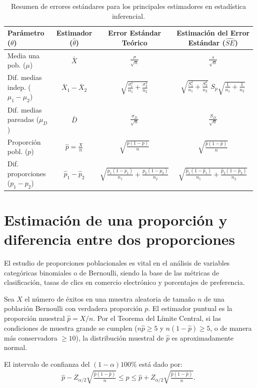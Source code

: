 \begin{table}[h!]
	\centering
	\begin{tabular}{lccc}
		\hline
		\textbf{Parámetro ($\theta$)} & \textbf{Estimador ($\hat{\theta}$)} & \textbf{Error Estándar Teórico} & \textbf{Estimación del Error Estándar ($\widehat{SE}$)} \\ \hline
		Media una pob. ($\mu$) & $\bar{X}$ & $\frac{\sigma}{\sqrt{n}}$ & $\frac{s}{\sqrt{n}}$ \\ [1.5ex]
		Dif. medias indep. ($\mu_1 - \mu_2$) & $\bar{X}_1 - \bar{X}_2$ & $\sqrt{\frac{\sigma_1^2}{n_1} + \frac{\sigma_2^2}{n_2}}$ & $\sqrt{\frac{S_1^2}{n_1} + \frac{S_2^2}{n_2}}$ \text{ o } $S_p \sqrt{\frac{1}{n_1} + \frac{1}{n_2}}$ \\ [1.5ex]
		Dif. medias pareadas ($\mu_D$) & $\bar{D}$ & $\frac{\sigma_D}{\sqrt{n}}$ & $\frac{S_D}{\sqrt{n}}$ \\ [1.5ex]
		Proporción pobl. ($p$) & $\hat{p} = \frac{X}{n}$ & $\sqrt{\frac{p(1-p)}{n}}$ & $\sqrt{\frac{\hat{p}(1-\hat{p})}{n}}$ \\ [1.5ex]
		Dif. proporciones ($p_1 - p_2$) & $\hat{p}_1 - \hat{p}_2$ & $\sqrt{\frac{p_1(1-p_1)}{n_1} + \frac{p_2(1-p_2)}{n_2}}$ & $\sqrt{\frac{\hat{p}_1(1-\hat{p}_1)}{n_1} + \frac{\hat{p}_2(1-\hat{p}_2)}{n_2}}$ \\ \hline
	\end{tabular}
	\caption{Resumen de errores estándares para los principales estimadores en estadística inferencial.}
	\label{tab:errores_estandar}
\end{table}

\section{Estimación de una proporción y diferencia entre dos proporciones}

El estudio de proporciones poblacionales es vital en el análisis de variables categóricas binomiales o de Bernoulli, siendo la base de las métricas de clasificación, tasas de clics en comercio electrónico y porcentajes de preferencia.

\begin{teorema}
	Sea $X$ el número de éxitos en una muestra aleatoria de tamaño $n$ de una población Bernoulli con verdadera proporción $p$. El estimador puntual es la proporción muestral $\hat{p} = X/n$. Por el Teorema del Límite Central, si las condiciones de muestra grande se cumplen ($n\hat{p} \geq 5$ y $n(1-\hat{p}) \geq 5$, o de manera más conservadora $\geq 10$), la distribución muestral de $\hat{p}$ es aproximadamente normal.
	
	El intervalo de confianza del $(1-\alpha)100\%$ está dado por:
	\begin{align}
		\hat{p} - Z_{\alpha/2} \sqrt{\frac{\hat{p}(1-\hat{p})}{n}} \leq p \leq \hat{p} + Z_{\alpha/2} \sqrt{\frac{\hat{p}(1-\hat{p})}{n}}.
	\end{align}
\end{teorema}

